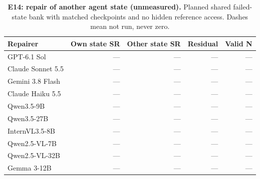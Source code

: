 \begin{table}[!ht]
\centering\small
\caption{\textbf{E14: repair of another agent state (unmeasured).} Planned shared failed-state bank with matched checkpoints and no hidden reference access. Dashes mean not run, never zero.}
\begin{tabularx}{\textwidth}{@{}Xrrrr@{}}\toprule
Repairer & Own state SR & Other state SR & Residual & Valid N\\\midrule
GPT-6.1 Sol & --- & --- & --- & ---\\
Claude Sonnet 5.5 & --- & --- & --- & ---\\
Gemini 3.8 Flash & --- & --- & --- & ---\\
Claude Haiku 5.5 & --- & --- & --- & ---\\
Qwen3.5-9B & --- & --- & --- & ---\\
Qwen3.5-27B & --- & --- & --- & ---\\
InternVL3.5-8B & --- & --- & --- & ---\\
Qwen2.5-VL-7B & --- & --- & --- & ---\\
Qwen2.5-VL-32B & --- & --- & --- & ---\\
Gemma 3-12B & --- & --- & --- & ---\\
\bottomrule
\end{tabularx}
\end{table}
